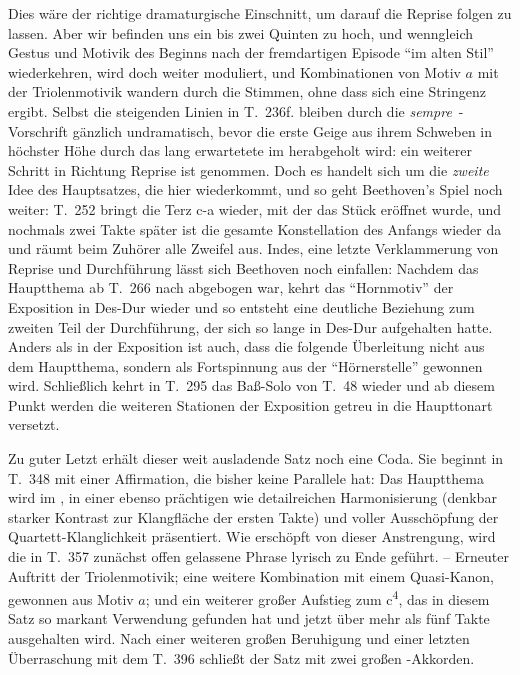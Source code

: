 Dies wäre der richtige dramaturgische Einschnitt, um darauf die Reprise
folgen zu lassen.  Aber wir befinden uns ein bis zwei Quinten zu hoch,
und wenngleich Gestus und Motivik des Beginns nach der fremdartigen
Episode \enquote{im alten Stil} wiederkehren, wird doch weiter moduliert,
und Kombinationen von Motiv $a$ mit der Triolenmotivik wandern durch
die Stimmen, ohne dass sich eine Stringenz ergibt.  Selbst die
steigenden Linien in T.~236f. bleiben durch die
\textit{sempre}~-Vorschrift gänzlich undramatisch,
bevor die erste Geige aus ihrem Schweben in höchster Höhe durch das
lang erwartetete  im  herabgeholt wird: ein weiterer
Schritt in Richtung Reprise ist genommen.  Doch es handelt sich um die
\emph{zweite} Idee des Hauptsatzes, die hier wiederkommt, und so geht
Beethoven’s Spiel noch weiter: T.~252 bringt  die
Terz \mbox{c-a} wieder, mit der das Stück eröffnet wurde, und nochmals
zwei Takte später ist die gesamte Konstellation des Anfangs wieder
da und räumt beim Zuhörer alle Zweifel aus.  Indes,
eine letzte Verklammerung von Reprise und Durchführung lässt sich
Beethoven noch einfallen: Nachdem das Hauptthema ab T.~266 nach
 abgebogen war, kehrt das \enquote{Hornmotiv} der Exposition in Des-Dur
wieder und so entsteht eine deutliche Beziehung zum zweiten Teil
der Durchführung, der sich so lange in Des-Dur aufgehalten hatte.
Anders als in der Exposition ist auch, dass die folgende Überleitung
nicht aus dem Hauptthema, sondern als Fortspinnung aus der \enquote{Hörnerstelle}
gewonnen wird.  Schließlich kehrt in T.~295 das Baß-Solo
von T.~48 wieder und ab diesem Punkt werden die weiteren Stationen der
Exposition getreu in die Haupttonart versetzt.

Zu guter Letzt erhält dieser weit ausladende Satz noch eine Coda.  Sie
beginnt in T.~348 mit einer Affirmation, die bisher keine Parallele hat: Das
Hauptthema wird im , in einer ebenso prächtigen
wie detailreichen Harmonisierung (denkbar starker Kontrast zur Klangfläche
der ersten Takte) und voller Ausschöpfung der Quartett-Klanglichkeit
präsentiert.  Wie erschöpft von dieser Anstrengung, wird die in T.~357
zunächst offen gelassene Phrase lyrisch zu Ende geführt.  –  Erneuter
Auftritt der Triolenmotivik; eine weitere Kombination mit einem
Quasi-Kanon, gewonnen aus Motiv $a$; und ein weiterer großer Aufstieg
zum c\textsuperscript{4}, das in diesem Satz so markant Verwendung
gefunden hat und jetzt über mehr als fünf Takte ausgehalten wird.  Nach
einer weiteren großen Beruhigung und einer letzten Überraschung mit dem
  T.~396 schließt der Satz mit zwei großen
-Akkorden.